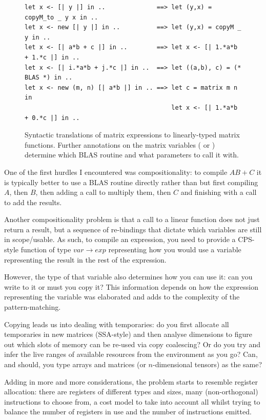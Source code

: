 \begin{figure}[tp]
    \begin{verbatim}
let x <- [| y |] in ..              ==> let (y,x) = copyM_to _ y x in ..
let x <- new [| y |] in ..          ==> let (y,x) = copyM _ y in ..
let x <- [| a*b + c |] in ..        ==> let x <- [| 1.*a*b + 1.*c |] in ..
let x <- [| i.*a*b + j.*c |] in ..  ==> let ((a,b), c) = (* BLAS *) in ..
let x <- new (m, n) [| a*b |] in .. ==> let c = matrix m n in
                                        let x <- [| 1.*a*b + 0.*c |] in ..
    \end{verbatim}
    \caption{Syntactic translations of matrix expressions to linearly-typed
        matrix functions. Further annotations on the matrix variables
        ( or ) determine which BLAS routine and what
        parameters to call it with.}\label{fig:mat_patterns}

\end{figure}

One of the first hurdles I encountered was compositionality: to compile $AB +
C$ it is typically better to use a BLAS routine directly rather than but first
compiling $A$, then $B$, then adding a call to multiply them, then $C$ and
finishing with a call to add the results.

Another compositionality problem is that a call to a linear function does not
just return a result, but a sequence of re-bindings that dictate which
variables are still in scope/usable.  As such, to compile an expression, you
need to provide a CPS-style function of type $var \rightarrow exp$ representing
how you would use a variable representing the result in the rest of the
expression.

However, the type of that variable also determines how you can use it: can you
write to it or must you copy it? This information depends on how the expression
representing the variable was elaborated and adds to the complexity of the
pattern-matching.

Copying leads us into dealing with temporaries: do you first allocate all
temporaries in new matrices (SSA-style) and then analyse dimensions to figure
out which slots of memory can be re-used via copy coalescing? Or do you try and
infer the live ranges of available resources from the environment as you go?
Can, and should, you type arrays and matrices (or $n$-dimensional tensors) as
the same?

Adding in more and more considerations, the problem starts to resemble register
allocation: there are registers of different types and sizes, many
(non-orthogonal) instructions to choose from, a cost model to take into account
all whilst trying to balance the number of registers in use and the number of
instructions emitted.

